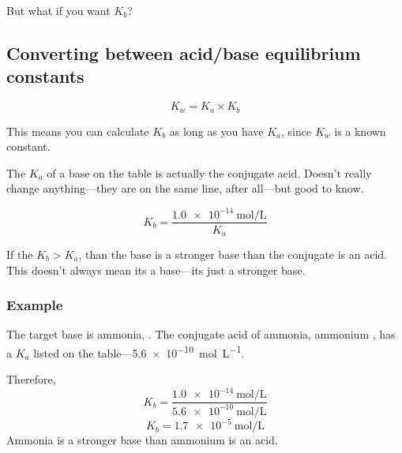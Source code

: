 \documentclass[a4paper,12pt]{article}
\begin{document}
But what if you want $K_b$?

\subsection{Converting between acid/base equilibrium constants}
\Large
$$K_w = K_a \times K_b$$
\normalsize

This means you can calculate $K_b$ as long as you have $K_a$, since $K_w$ is a known constant.

The $K_a$ of a base on the table is actually the conjugate acid. Doesn't really change anything---they are on the same line, after all---but good to know.

\Large
$$K_b = \frac{\SI{1.0e-14}{\mol\per\L}}{K_a}$$
\normalsize

If the $K_b > K_a$, than the base is a stronger base than the conjugate is an acid. This doesn't always mean its a base---its just a stronger base.

\subsubsection{Example}
The target base is ammonia, . The conjugate acid of ammonia, ammonium , has a $K_a$ listed on the table---\SI{5.6e-10}{\mol\per\L}.

Therefore,
$$K_b = \frac{\SI{1.0e-14}{\mol\per\L}}{\SI{5.6e-10}{\mol\per\L}}$$
$$K_b = \SI{1.7e-5}{\mol\per\L}$$
Ammonia  is a stronger base than ammonium  is an acid.
\end{document}
